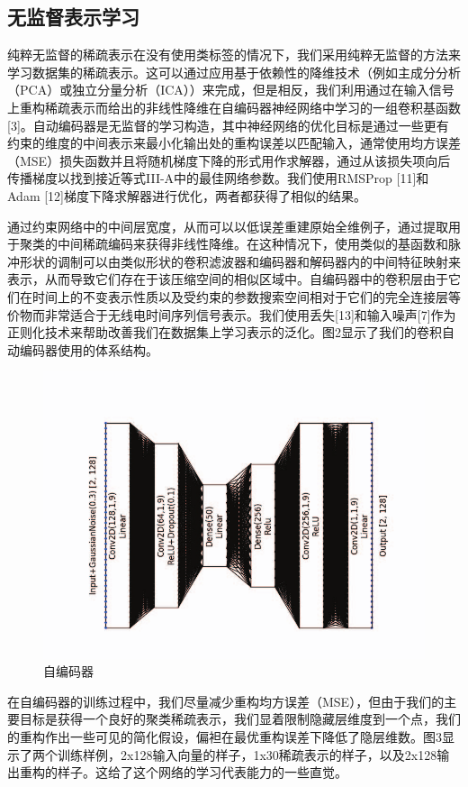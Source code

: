\subsection{无监督表示学习}
纯粹无监督的稀疏表示在没有使用类标签的情况下，我们采用纯粹无监督的方法来学习数据集的稀疏表示。这可以通过应用基于依赖性的降维技术（例如主成分分析（PCA）或独立分量分析（ICA））来完成，但是相反，我们利用通过在输入信号上重构稀疏表示而给出的非线性降维在自编码器神经网络中学习的一组卷积基函数[3]。自动编码器是无监督的学习构造，其中神经网络的优化目标是通过一些更有约束的维度的中间表示来最小化输出处的重构误差以匹配输入，通常使用均方误差（MSE）损失函数并且将随机梯度下降的形式用作求解器，通过从该损失项向后传播梯度以找到接近等式III-A中的最佳网络参数。我们使用RMSProp [11]和Adam [12]梯度下降求解器进行优化，两者都获得了相似的结果。\par
通过约束网络中的中间层宽度，从而可以以低误差重建原始全维例子，通过提取用于聚类的中间稀疏编码来获得非线性降维。在这种情况下，使用类似的基函数和脉冲形状的调制可以由类似形状的卷积滤波器和编码器和解码器内的中间特征映射来表示，从而导致它们存在于该压缩空间的相似区域中。自编码器中的卷积层由于它们在时间上的不变表示性质以及受约束的参数搜索空间相对于它们的完全连接层等价物而非常适合于无线电时间序列信号表示。我们使用丢失[13]和输入噪声[7]作为正则化技术来帮助改善我们在数据集上学习表示的泛化。图2显示了我们的卷积自动编码器使用的体系结构。\par
\begin{figure}[!h]
	\centering
	\includegraphics[scale=0.3]{figures/chapter_3/CAE}
	\caption{自编码器}	\label{fig_3_2}
\end{figure}
在自编码器的训练过程中，我们尽量减少重构均方误差（MSE），但由于我们的主要目标是获得一个良好的聚类稀疏表示，我们显着限制隐藏层维度到一个点，我们的重构作出一些可见的简化假设，偏袒在最优重构误差下降低了隐层维数。图3显示了两个训练样例，2x128输入向量的样子，1x30稀疏表示的样子，以及2x128输出重构的样子。这给了这个网络的学习代表能力的一些直觉。\par
